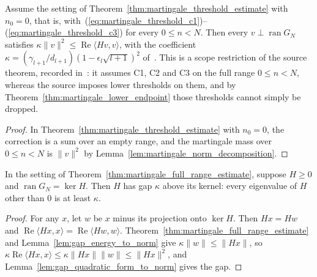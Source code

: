\begin{theorem}
    \label{thm:martingale_full_range_estimate}
    \leanok
    Assume the setting of Theorem~\ref{thm:martingale_threshold_estimate} with $n_0=0$,
    that is, with~(\ref{eq:martingale_threshold_c1})--(\ref{eq:martingale_threshold_c3})
    for every $0\le n<N$. Then every $v\perp\operatorname{ran}G_N$ satisfies
    $\kappa\lVert v\rVert^2\le\operatorname{Re}\langle Hv,v\rangle$, with the
    coefficient $\kappa=(\gamma_{l+1}/d_{l+1})(1-\epsilon_l\sqrt{l+1})^2$
    of~\cite[Theorem~2.1(i)]{Nachtergaele1996Spectral}. This is a scope restriction of
    the source theorem, recorded
    in~\cite{gap:nachtergaele96_theorem_2_1_lower_endpoint}: it assumes C1, C2 and C3 on
    the full range $0\le n<N$, whereas the source imposes lower thresholds on them, and
    by Theorem~\ref{thm:martingale_lower_endpoint} those thresholds cannot simply be
    dropped.
\end{theorem}
\begin{proof}\leanok
    In Theorem~\ref{thm:martingale_threshold_estimate} with $n_0=0$, the correction is
    a sum over an empty range, and the martingale mass over $0\le n<N$ is
    $\lVert v\rVert^2$ by Lemma~\ref{lem:martingale_norm_decomposition}.
\end{proof}

\begin{theorem}
    \label{thm:martingale_full_range_norm_gap}
    \leanok
    In the setting of Theorem~\ref{thm:martingale_full_range_estimate}, suppose $H\ge0$
    and $\operatorname{ran}G_N=\ker H$. Then $H$ has gap $\kappa$ above its kernel: every
    eigenvalue of $H$ other than $0$ is at least $\kappa$.
\end{theorem}
\begin{proof}\leanok
    For any $x$, let $w$ be $x$ minus its projection onto $\ker H$. Then $Hx=Hw$ and
    $\operatorname{Re}\langle Hx,x\rangle=\operatorname{Re}\langle Hw,w\rangle$.
    Theorem~\ref{thm:martingale_full_range_estimate} and
    Lemma~\ref{lem:gap_energy_to_norm} give $\kappa\lVert w\rVert\le\lVert Hx\rVert$, so
    $\kappa\operatorname{Re}\langle Hx,x\rangle\le\kappa\lVert Hx\rVert\lVert w\rVert
        \le\lVert Hx\rVert^2$, and Lemma~\ref{lem:gap_quadratic_form_to_norm} gives the
    gap.
\end{proof}

